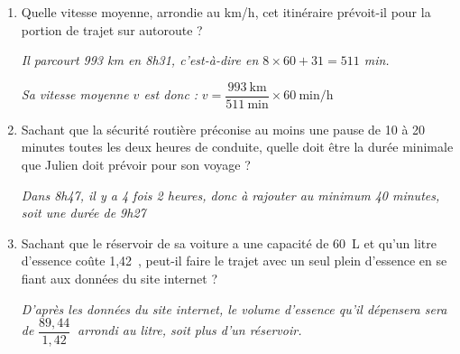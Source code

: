 \documentclass[10pt]{article}
\newcommand{\euro}{\eurologo{}}
\begin{document}
\begin{enumerate}
\item Quelle vitesse moyenne, arrondie au km/h, cet itinéraire prévoit-il pour la portion de trajet sur autoroute ? 

\textit{Il parcourt 993 km en 8h31, c'est-à-dire en $8\times 60+31=511$ min.}

\textit{Sa vitesse moyenne $v$ est donc :} $v=\dfrac{993~\text{km}}{511~\text{min}}\times 60~\text{min/h}$ 
\item Sachant que la sécurité routière préconise au moins une pause de 10 à 20 minutes toutes les deux heures de conduite, quelle doit être la durée minimale que Julien doit prévoir pour son voyage ?

\textit{Dans 8h47, il y a 4 fois 2 heures, donc à rajouter au minimum 40 minutes, soit une durée de 9h27} 

\medskip

 
\item %

Sachant que le réservoir de sa voiture a une capacité de 60~L et qu'un litre d'essence coûte 1,42~\euro, peut-il faire le trajet avec un seul plein d'essence en se fiant aux données du site internet ?

\textit{D'après les données du site internet, le volume d'essence qu'il dépensera sera de} $\dfrac{89,44}{1,42}\:$ \textit{arrondi au litre, soit plus d'un réservoir.}
\end{enumerate}
 
\vspace{0,5cm}
\end{document}
